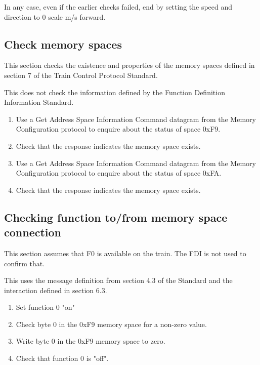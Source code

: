 In any case, even if the earlier checks failed, end by setting the speed 
and direction to 0 scale m/s forward.

\subsection{Check memory spaces}

This section checks the existence and properties of the memory spaces defined in section 7
of the Train Control Protocol Standard.

This does not check the information defined by the 
Function Definition Information Standard.

\begin{enumerate}

\item Use a Get Address Space Information Command datagram from the Memory Configuration protocol
to enquire about the status of space 0xF9.

\item Check that the response indicates the memory space exists.

\item Use a Get Address Space Information Command datagram from the Memory Configuration protocol
to enquire about the status of space 0xFA.

\item Check that the response indicates the memory space exists.

\end{enumerate}
    
\subsection{Checking function to/from memory space connection}

This section assumes that F0 is available on the train.
The FDI is not used to confirm that.

This uses the message definition from section 4.3 of the Standard 
and the interaction defined in section 6.3.

\begin{enumerate}

    \item Set function 0 "on"

    \item Check byte 0 in the 0xF9 memory space for a non-zero value.

    \item Write byte 0 in the 0xF9 memory space to zero.

    \item Check that function 0 is "off".

\end{enumerate}


